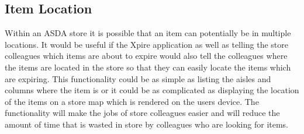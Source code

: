 \documentclass[a4paper,11pt]{report}
\begin{document}
\subsection{Item Location}
Within an ASDA store it is possible that an item can potentially be in multiple locations. It would be useful if the Xpire application as well as telling the store colleagues which items are about to expire would also tell the colleagues where the items are located in the store so that they can easily locate the items which are expiring. 
This functionality could be as simple as listing the aisles and columns where the item is or it could be as complicated as displaying the location of the items on a store map which is rendered on the users device. The functionality will make the jobs of store colleagues easier and will reduce the amount of time that is wasted in store by colleagues who are looking for items. 





\end{document}
